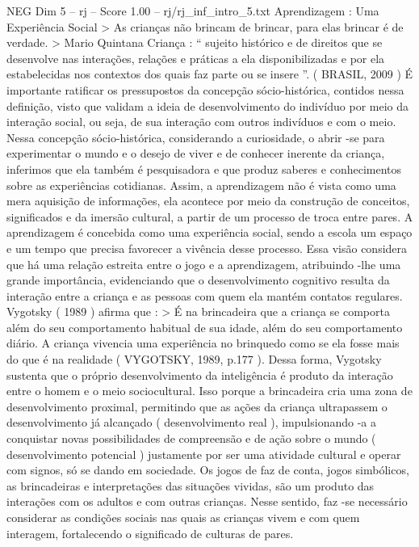 \begin{textsample}{NEG Dim 5 – rj – Score 1.00 – rj/rj\_inf\_intro\_5.txt}  \label{ex:f5_neg_099}
Aprendizagem : Uma Experiência Social > As crianças não brincam de brincar, para elas brincar é de verdade. > Mario Quintana Criança : “ sujeito histórico e de direitos que se desenvolve nas interações, relações e práticas a ela disponibilizadas e por ela estabelecidas nos contextos dos quais faz parte ou se insere ”. ( BRASIL, 2009 ) É importante ratificar os pressupostos da concepção sócio-histórica, contidos nessa definição, visto que validam a ideia de desenvolvimento do indivíduo por meio da interação social, ou seja, de sua interação com outros indivíduos e com o meio.
Nessa concepção sócio-histórica, considerando a curiosidade, o abrir -se para experimentar o mundo e o desejo de viver e de conhecer inerente da criança, inferimos que ela também é pesquisadora e que produz saberes e conhecimentos sobre as experiências cotidianas.
Assim, a aprendizagem não é vista como uma mera aquisição de informações, ela acontece por meio da construção de conceitos, significados e da imersão cultural, a partir de um processo de troca entre pares.
A aprendizagem é concebida como uma experiência social, sendo a escola um espaço e um tempo que precisa favorecer a vivência desse processo.
Essa visão considera que há uma relação estreita entre o jogo e a aprendizagem, atribuindo -lhe uma grande importância, evidenciando que o desenvolvimento cognitivo resulta da interação entre a criança e as pessoas com quem ela mantém contatos regulares.
Vygotsky ( 1989 ) afirma que : > É na brincadeira que a criança se comporta além do seu comportamento habitual de sua idade, além do seu comportamento diário.
A criança vivencia uma experiência no brinquedo como se ela fosse mais do que é na realidade ( VYGOTSKY, 1989, p.177 ).
Dessa forma, Vygotsky sustenta que o próprio desenvolvimento da inteligência é produto da interação entre o homem e o meio sociocultural.
Isso porque a brincadeira cria uma zona de desenvolvimento proximal, permitindo que as ações da criança ultrapassem o desenvolvimento já alcançado ( desenvolvimento real ), impulsionando -a a conquistar novas possibilidades de compreensão e de ação sobre o mundo ( desenvolvimento potencial ) justamente por ser uma atividade cultural e operar com signos, só se dando em sociedade.
Os jogos de faz de conta, jogos simbólicos, as brincadeiras e interpretações das situações vividas, são um produto das interações com os adultos e com outras crianças.
Nesse sentido, faz -se necessário considerar as condições sociais nas quais as crianças vivem e com quem interagem, fortalecendo o significado de culturas de pares.

\end{textsample}
